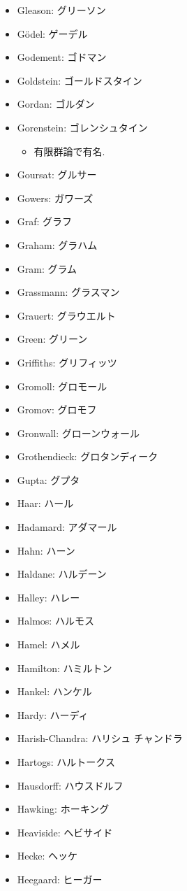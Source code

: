 \documentclass[openany, a4paper, oneside]{jsbook}
\begin{document}
\begin{itemize}
\item Gleason: グリーソン
\item G\"odel: ゲーデル
\item Godement: ゴドマン
\item Goldstein: ゴールドスタイン
\item Gordan: ゴルダン
\item Gorenstein: ゴレンシュタイン
\begin{itemize}
\item 有限群論で有名.
\end{itemize}
\item Goursat: グルサー
\item Gowers: ガワーズ
\item Graf: グラフ
\item Graham: グラハム
\item Gram: グラム
\item Grassmann: グラスマン
\item Grauert: グラウエルト
\item Green: グリーン
\item Griffiths: グリフィッツ
\item Gromoll: グロモール
\item Gromov: グロモフ
\item Gronwall: グローンウォール
\item Grothendieck: グロタンディーク
\item Gupta: グプタ
\item Haar: ハール
\item Hadamard: アダマール
\item Hahn: ハーン
\item Haldane: ハルデーン
\item Halley: ハレー
\item Halmos: ハルモス
\item Hamel: ハメル
\item Hamilton: ハミルトン
\item Hankel: ハンケル
\item Hardy: ハーディ
\item Harish-Chandra: ハリシュ チャンドラ
\item Hartogs: ハルトークス
\item Hausdorff: ハウスドルフ
\item Hawking: ホーキング
\item Heaviside: ヘビサイド
\item Hecke: ヘッケ
\item Heegaard: ヒーガー

\end{itemize}
\end{document}
